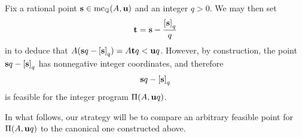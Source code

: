\documentclass[11pt]{amsart}
\renewcommand{\!}[1]{{\color{red}\text{$\star$\,}#1\,$\star$}}
\begin{document}
%
%
%




\begin{remark}
\label{canonical-feasible: R}
Fix a rational point $\mathbf{s} \in \operatorname{mc}_{\mathbb{Q}}(A, \mathbf{u})$ and an integer $q>0$.  We may then set \[ \mathbf{t} = \mathbf{s} - \frac{\left[ \mathbf{s} \right]_q}{q} \] in  to deduce that $A (\mathbf{s} q - \left[ \mathbf{s} \right]_q ) =  A\mathbf{t}q <  \mathbf{u}q$.  However, by construction, the point $\mathbf{s}q - \left[ \mathbf{s} \right]_q$ has nonnegative integer coordinates, and therefore \[ \mathbf{s}q - \left[ \mathbf{s} \right]_q\] is feasible for the integer program $\Pi(A, \mathbf{u}q)$. 
\end{remark}

 In what follows, our strategy will be to compare an arbitrary feasible point for $\Pi(A, \mathbf{u}q)$ to the canonical one constructed above.   


\end{document}

